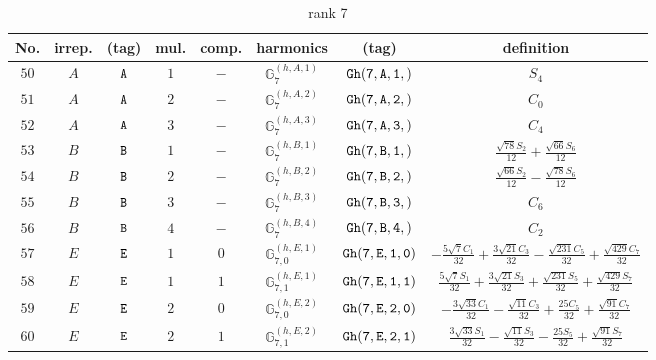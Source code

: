 \documentclass[fleqn,8pt]{jsarticle}
\begin{document}
\begin{table}[ht!]
\begin{center}
\caption{rank 7}
\renewcommand{\arraystretch}{1.3}
\begin{tabular}{cccccccc} \hline \hline
No. & irrep. & (tag) & mul. & comp. & harmonics & (tag) & definition \\ \hline
$ 50 $ & $ A $ & $ {\tt A} $ & $ 1 $ & $ - $ & $ \mathbb{G}_{7}^{(h,A,1)} $ & $ {\tt Gh(7,A,1,)} $ & $ S_{4} $ \\
$ 51 $ & $ A $ & $ {\tt A} $ & $ 2 $ & $ - $ & $ \mathbb{G}_{7}^{(h,A,2)} $ & $ {\tt Gh(7,A,2,)} $ & $ C_{0} $ \\
$ 52 $ & $ A $ & $ {\tt A} $ & $ 3 $ & $ - $ & $ \mathbb{G}_{7}^{(h,A,3)} $ & $ {\tt Gh(7,A,3,)} $ & $ C_{4} $ \\
$ 53 $ & $ B $ & $ {\tt B} $ & $ 1 $ & $ - $ & $ \mathbb{G}_{7}^{(h,B,1)} $ & $ {\tt Gh(7,B,1,)} $ & $ \frac{\sqrt{78} S_{2}}{12} + \frac{\sqrt{66} S_{6}}{12} $ \\
$ 54 $ & $ B $ & $ {\tt B} $ & $ 2 $ & $ - $ & $ \mathbb{G}_{7}^{(h,B,2)} $ & $ {\tt Gh(7,B,2,)} $ & $ \frac{\sqrt{66} S_{2}}{12} - \frac{\sqrt{78} S_{6}}{12} $ \\
$ 55 $ & $ B $ & $ {\tt B} $ & $ 3 $ & $ - $ & $ \mathbb{G}_{7}^{(h,B,3)} $ & $ {\tt Gh(7,B,3,)} $ & $ C_{6} $ \\
$ 56 $ & $ B $ & $ {\tt B} $ & $ 4 $ & $ - $ & $ \mathbb{G}_{7}^{(h,B,4)} $ & $ {\tt Gh(7,B,4,)} $ & $ C_{2} $ \\
$ 57 $ & $ E $ & $ {\tt E} $ & $ 1 $ & $ 0 $ & $ \mathbb{G}_{7,0}^{(h,E,1)} $ & $ {\tt Gh(7,E,1,0)} $ & $ - \frac{5 \sqrt{7} C_{1}}{32} + \frac{3 \sqrt{21} C_{3}}{32} - \frac{\sqrt{231} C_{5}}{32} + \frac{\sqrt{429} C_{7}}{32} $ \\
$ 58 $ & $ E $ & $ {\tt E} $ & $ 1 $ & $ 1 $ & $ \mathbb{G}_{7,1}^{(h,E,1)} $ & $ {\tt Gh(7,E,1,1)} $ & $ \frac{5 \sqrt{7} S_{1}}{32} + \frac{3 \sqrt{21} S_{3}}{32} + \frac{\sqrt{231} S_{5}}{32} + \frac{\sqrt{429} S_{7}}{32} $ \\
$ 59 $ & $ E $ & $ {\tt E} $ & $ 2 $ & $ 0 $ & $ \mathbb{G}_{7,0}^{(h,E,2)} $ & $ {\tt Gh(7,E,2,0)} $ & $ - \frac{3 \sqrt{33} C_{1}}{32} - \frac{\sqrt{11} C_{3}}{32} + \frac{25 C_{5}}{32} + \frac{\sqrt{91} C_{7}}{32} $ \\
$ 60 $ & $ E $ & $ {\tt E} $ & $ 2 $ & $ 1 $ & $ \mathbb{G}_{7,1}^{(h,E,2)} $ & $ {\tt Gh(7,E,2,1)} $ & $ \frac{3 \sqrt{33} S_{1}}{32} - \frac{\sqrt{11} S_{3}}{32} - \frac{25 S_{5}}{32} + \frac{\sqrt{91} S_{7}}{32} $ \\

\end{tabular}
\end{center}
\end{table}
\end{document}
